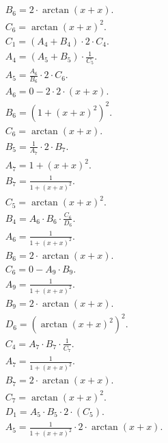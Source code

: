 \documentclass[12pt,a4paper]{extreport}
\begin{document}
\begin{multline}
\\
B_{6} = 2 \cdot \arctan(x + x).\\
C_{6} = \arctan(x + x) ^ {2}.\\
C_{1} = (A_{4} + B_{4}) \cdot 2 \cdot C_{4}.\\
A_{4} = (A_{5} + B_{5}) \cdot \frac{1}{C_{5}}.\\
A_{5} = \frac{A_{6}}{B_{6}} \cdot 2 \cdot C_{6}.\\
A_{6} = 0 - 2 \cdot 2 \cdot (x + x).\\
B_{6} = (1 + (x + x) ^ {2}) ^ {2}.\\
C_{6} = \arctan(x + x).\\
B_{5} = \frac{1}{A_{7}} \cdot 2 \cdot B_{7}.\\
A_{7} = 1 + (x + x) ^ {2}.\\
B_{7} = \frac{1}{1 + (x + x) ^ {2}}.\\
C_{5} = \arctan(x + x) ^ {2}.\\
B_{4} = A_{6} \cdot B_{6} \cdot \frac{C_{6}}{D_{6}}.\\
A_{6} = \frac{1}{1 + (x + x) ^ {2}}.\\
B_{6} = 2 \cdot \arctan(x + x).\\
C_{6} = 0 - A_{9} \cdot B_{9}.\\
A_{9} = \frac{1}{1 + (x + x) ^ {2}}.\\
B_{9} = 2 \cdot \arctan(x + x).\\
D_{6} = (\arctan(x + x) ^ {2}) ^ {2}.\\
C_{4} = A_{7} \cdot B_{7} \cdot \frac{1}{C_{7}}.\\
A_{7} = \frac{1}{1 + (x + x) ^ {2}}.\\
B_{7} = 2 \cdot \arctan(x + x).\\
C_{7} = \arctan(x + x) ^ {2}.\\
D_{1} = A_{5} \cdot B_{5} \cdot 2 \cdot (C_{5}).\\
A_{5} = \frac{1}{1 + (x + x) ^ {2}} \cdot 2 \cdot \arctan(x + x).\\
\end{multline}
\end{document}
